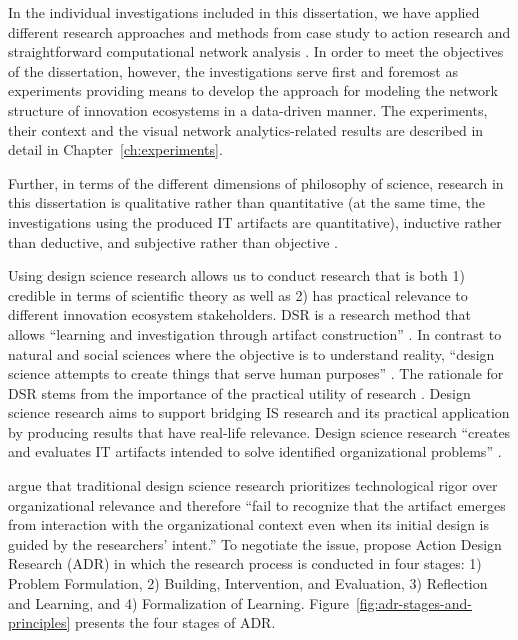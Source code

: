 In the individual investigations included in this dissertation, we have applied different research approaches and methods from case study \citep{Yin2003CaseMethods} to action research and straightforward computational network analysis \citep{Lazer2009ComputationalScience}. In order to meet the objectives of the dissertation, however, the investigations serve first and foremost as experiments providing means to develop the approach for modeling the network structure of innovation ecosystems in a data-driven manner. The experiments, their context and the visual network analytics-related results are described in detail in Chapter~\ref{ch:experiments}.

Further, in terms of the different dimensions of philosophy of science, research in this dissertation is qualitative rather than quantitative (at the same time, the investigations using the produced IT artifacts are quantitative), inductive rather than deductive, and subjective rather than objective \citep[cf.][]{Olsson2012UserServices}. 

Using design science research allows us to conduct research that is both 1) credible in terms of scientific theory as well as 2) has practical relevance to different innovation ecosystem stakeholders. DSR is a research method that allows “learning and investigation through artifact construction” \citep[][p.~187]{Vaishnavi2007}. In contrast to natural and social sciences where the objective is to understand reality, ``design science attempts to create things that serve human purposes'' \citep{Simon1969}. The rationale for DSR stems from the importance of the practical utility of research \citep{Peffers2007}. Design science research aims to support bridging IS research and its practical application by producing results that have real-life relevance. Design science research ``creates and evaluates IT artifacts intended to solve identified organizational problems'' \citep{Hevner2004}.


\cite{Sein2011ActionResearch} argue that traditional design science research prioritizes technological rigor over organizational relevance and therefore ``fail to recognize that the artifact emerges from interaction with the organizational context even when its initial design is guided by the researchers’ intent.'' To negotiate the issue, \cite{Sein2011ActionResearch} propose Action Design Research (ADR) in which the research process is conducted in four stages: 1) Problem Formulation, 2) Building, Intervention, and Evaluation, 3) Reflection and Learning, and 4) Formalization of Learning. Figure~\ref{fig:adr-stages-and-principles} presents the four stages of ADR.

